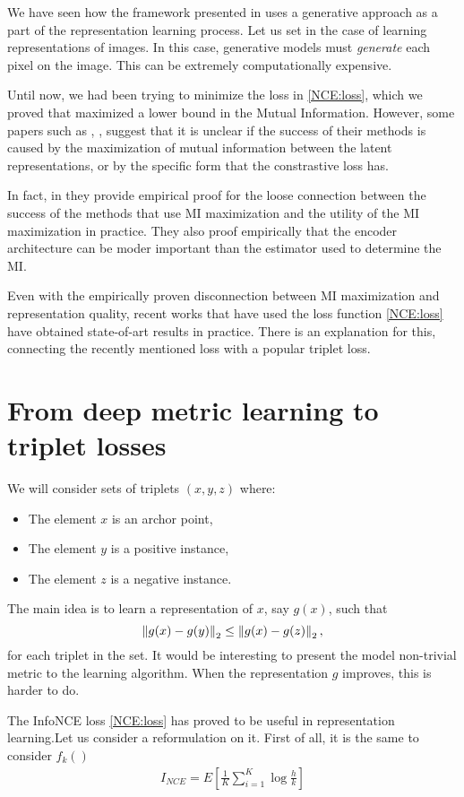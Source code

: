 
We have seen how the framework presented in \cite{oord_et_al} uses a generative approach as a part of the representation learning process. Let us set in the case of learning representations of images. In this case, generative models must \emph{generate} each pixel on the image. This can be extremely computationally expensive. 

Until now, we had been trying to minimize the loss in \ref{NCE:loss}, which we proved that maximized a lower bound in the Mutual Information. However, some papers such as \cite{chen_simple_2020}, \cite{tschannen_mutual_2020}, suggest that it is unclear if the success of their methods is caused by the maximization of mutual information between the latent representations, or by the specific form that the constrastive loss has.

In fact, in \cite{tschannen_mutual_2020} they provide empirical proof for the loose connection between the success of the methods that use MI maximization and the utility of the MI maximization in practice. They also proof empirically that the encoder architecture can be moder important than the estimator used to determine the MI.

Even with the empirically proven disconnection between MI maximization and representation quality, recent works that have used the loss function \ref{NCE:loss} have obtained state-of-art results in practice. There is an explanation for this, connecting the recently mentioned loss with a popular triplet loss.

\section{From deep metric learning to triplet losses}

We will consider sets of triplets $(x,y,z)$ where:
\begin{itemize}
\item The element $x$ is an archor point,
\item The element $y$ is a positive instance,
\item The element $z$ is a negative instance.
\end{itemize}
The main idea is to learn a representation of $x$, say $g(x)$, such that 
$$
\left\lVert g(x) - g(y)\right\rVert_2 \leq \left\lVert g(x) - g(z)\right\rVert_2,
$$
for each triplet in the set. It would be interesting to present the model non-trivial metric to the learning algorithm. When the representation $g$ improves, this is harder to do.

The InfoNCE loss \ref{NCE:loss} has proved to be useful in representation learning.Let us consider a reformulation on it. First of all, it is the same to consider $f_k()$
\begin{align*}
I_{NCE} = E\left[ \frac{1}{K} \sum_{i = 1}^K \log \frac{h}{k}\right]
\end{align*}